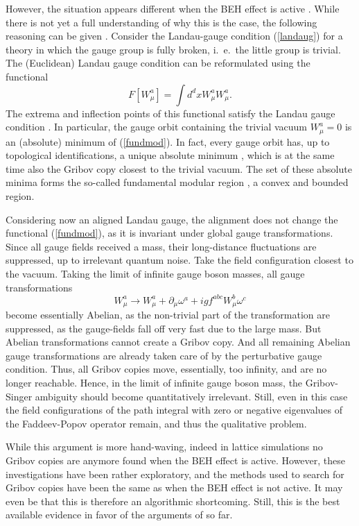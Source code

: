 \documentclass[final,twoside,12pt]{article}
\newcommand*{\no}{\noindent}
\newcommand*{\be}{\begin{equation}}
\newcommand*{\ee}{\end{equation}}
\newcommand*{\pd}{\partial}
\newcommand*{\pdm}{\pd_{\mu}}
\newcommand*{\pref}[1]{(\ref{#1})}
\newcommand*{\nn}{\nonumber}
\newcommand*{\1}{1\!\!\!\bot}
\begin{document}
However, the situation appears different when the BEH effect is active \cite{Lenz:1994tb,Lenz:2000zt,Maas:2010nc,Ilderton:2010tf,Capri:2012ah,Capri:2012cr,Capri:2013oja,Capri:2013gha,Capri:2016gut,Greensite:2004ke}. While there is not yet a full understanding of why this is the case, the following reasoning can be given \cite{Lenz:2000zt}. Consider the Landau-gauge condition \pref{landaug} for a theory in which the gauge group is fully broken, i.\ e.\ the little group is trivial. The (Euclidean) Landau gauge condition can be reformulated using the functional \cite{Maas:2011se,Zwanziger:1993dh}
\be
F[W_\mu^a]=\int d^dx W_\mu^a W_\mu^a\label{fundmod}.
\ee
\no The extrema and inflection points of this functional satisfy the Landau gauge condition \cite{Zwanziger:1993dh}. In particular, the gauge orbit containing the trivial vacuum $W_\mu^a=0$ is an (absolute) minimum of \pref{fundmod}. In fact, every gauge orbit has, up to topological identifications, a unique absolute minimum \cite{Zwanziger:1993dh,vanBaal:1997gu,vanBaal:1991zw,Dell'Antonio:1991xt}, which is at the same time also the Gribov copy closest to the trivial vacuum. The set of these absolute minima forms the so-called fundamental modular region \cite{Zwanziger:1993dh,vanBaal:1991zw,Dell'Antonio:1991xt}, a convex and bounded region.

Considering now an aligned Landau gauge, the alignment does not change the functional \pref{fundmod}, as it is invariant under global gauge transformations. Since all gauge fields received a mass, their long-distance fluctuations are suppressed, up to irrelevant quantum noise. Take the field configuration closest to the vacuum. Taking the limit of infinite gauge boson masses, all gauge transformations
\be
W_\mu^a\to W^a_\mu+\pdm\omega^a+igf^{abc}W^b_\mu\omega^c\nn
\ee
\no become essentially Abelian, as the non-trivial part of the transformation are suppressed, as the gauge-fields fall off very fast due to the large mass. But Abelian transformations cannot create a Gribov copy. And all remaining Abelian gauge transformations are already taken care of by the perturbative gauge condition. Thus, all Gribov copies move, essentially, too infinity, and are no longer reachable. Hence, in the limit of infinite gauge boson mass, the Gribov-Singer ambiguity should become quantitatively irrelevant. Still, even in this case the field configurations of the path integral with zero or negative eigenvalues of the Faddeev-Popov operator remain, and thus the qualitative problem.

While this argument is more hand-waving, indeed in lattice simulations \cite{Maas:2010nc} no Gribov copies are anymore found when the BEH effect is active. However, these investigations have been rather exploratory, and the methods used to search for Gribov copies have been the same as when the BEH effect is not active. It may even be that this is therefore an algorithmic shortcoming. Still, this is the best available evidence in favor of the arguments of \cite{Lenz:2000zt} so far.
\end{document}
